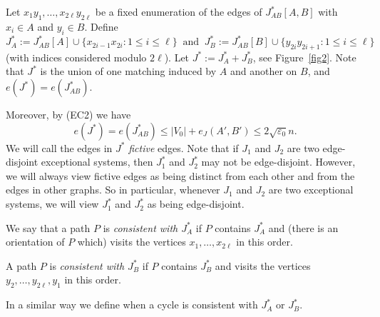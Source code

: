 \documentclass{memo-l}
\def\COMMENT#1{}
\def\eps{\varepsilon}
\numberwithin{section}{chapter}
\numberwithin{equation}{section}
\numberwithin{firstthm}{section}
\numberwithin{figure}{section}
\begin{document}
Let $x_1y_1, \dots, x_{2\ell}y_{2\ell}$ be a fixed enumeration of the edges of $J^*_{AB}[A,B]$ with $x_i \in A$ and $y_i \in B$.
Define 
$$
J_A^* := J^*_{AB}[A] \cup \{x_{2i-1} x_{2i} :1 \le i \le \ell \}  \ \mbox{ and } \ J_B^* := J^*_{AB}[B] \cup \{y_{2i} y_{2i+1} :1 \le i \le \ell \}$$ 
(with indices considered modulo $2\ell$).
Let $J^* := J_A^* + J_B^*$, see Figure~\ref{fig2}. Note that $J^*$ is the union of one matching induced by $A$ and another on $B$,
and $e(J^*) = e(J^*_{AB})$.%
\COMMENT{Deryk: new first part of sentence, ref to figure and additional inequality for later reference.}
Moreover, by (EC2) we have
\begin{equation}
	e(J^*) = e(J^*_{AB}) \le |V_0| + e_J(A',B') \le 2 \sqrt{\eps_0} n. \label{ESeq}
\end{equation}
We will call the edges in $J^*$ \emph{fictive} edges. Note that if $J_1$ and $J_2$ are two edge-disjoint exceptional systems, then $J^*_1$
and $J^*_2$ may not be edge-disjoint. However, we will always view fictive edges as being distinct from each other and from the edges
in other graphs. So in particular, whenever $J_1$ and $J_2$ are two exceptional systems, we will view $J^*_1$
and $J^*_2$ as being edge-disjoint.

We say that a path $P$ is \emph{consistent with $J_A^*$} if $P$ contains $J_A^*$ and (there is an orientation of $P$ which)
visits the vertices $x_1, \dots ,x_{2\ell}$ in this order.%
    \COMMENT{We need to prescribe a vertex rather than an edge ordering as it is important in Proposition~\ref{prop:ES}.}
A path $P$ is \emph{consistent with $J_B^*$} if $P$ contains $J_B^*$ and visits the vertices $y_2, \dots ,y_{2\ell},y_1$ in this order.%
   \COMMENT{Note that the order is $y_2,y_3, \dots ,y_{2\ell}, y_1$ rather than $y_1, \dots ,y_{2\ell}$.}
In a similar way we define when a cycle is consistent with $J_A^*$ or $J_B^*$.
\end{document}
